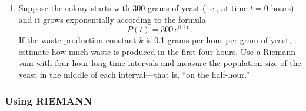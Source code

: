 \begin{enumerate}
\item Suppose the colony starts with 300 grams of yeast (i.e., at time $t = 0$ hours) and it grows exponentially according to the formula
	\[
P(t) = 300\,e^{0.2\,t} \, .
\]
If the waste production constant $k$ is 0.1 grams per hour per gram of yeast, estimate how much waste is produced in the first four hours.  Use a Riemann sum with four hour-long time intervals and measure the population size of the yeast in the middle of each interval---that is, ``on the half-hour.''


\end{enumerate}
\subsubsection{Using RIEMANN}
\label{subsubsec:using-riemann}





